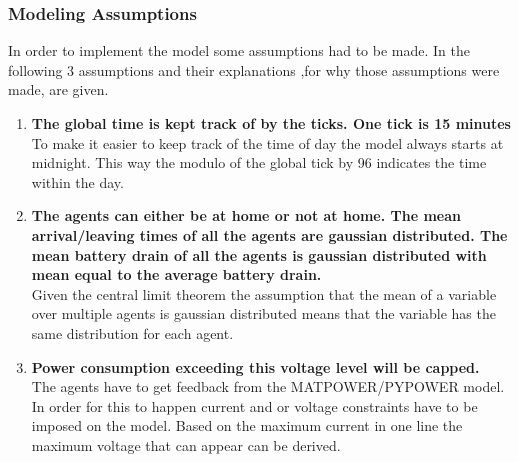 \documentclass[a4paper]{article}
\begin{document}
\subsubsection{Modeling Assumptions}
In order to implement the model some assumptions had to be made. In the following 3 assumptions and their explanations ,for 
why those assumptions were made, are given. 
\begin{enumerate}
                            \item \textbf{The global time is kept track of by the ticks. One tick is 15 minutes} \\
			     To make it easier to keep track of the time of day the model always starts at midnight. 
			     This way the modulo of the global tick by 96 indicates the time within the day.
			    \item \textbf{The agents can either be at home or not at home. The mean arrival/leaving times of 
			    all the agents are gaussian distributed. The mean battery drain of all the agents is 
			    gaussian distributed with mean equal to the average battery drain.} \\
			    Given the central limit theorem the assumption that the mean of a variable over multiple agents is 
			    gaussian distributed  means that  the variable has the same distribution for each agent.
			    \item \textbf{Power consumption exceeding this voltage level will be capped. } \\
			    The agents have to get feedback from the MATPOWER/PYPOWER model. In order for this to happen current 
			    and or voltage constraints have to be imposed on the model. Based on the maximum current in one
			    line the maximum voltage that can appear can be derived. 
                           \end{enumerate}
                           
\end{document}
